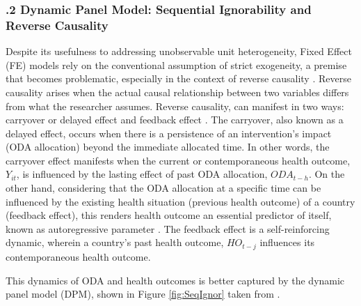 \subsubsection*{.2 Dynamic Panel Model: Sequential Ignorability and Reverse Causality}
Despite its usefulness to addressing unobservable unit heterogeneity, Fixed Effect (FE) models rely on the conventional assumption of strict exogeneity, a premise that becomes problematic, especially in the context of reverse causality \parencite{leszczensky2022deal, blackwell2018make, becker2023many}. Reverse causality arises when the actual causal relationship between two variables differs from what the researcher assumes. 
Reverse causality, can manifest in two ways: carryover or delayed effect and feedback effect \parencite{leszczensky2022deal, becker2023many}. The carryover, also known as a delayed effect, occurs when there is a persistence of an intervention's impact (ODA allocation) beyond the immediate allocated time. In other words, the carryover effect manifests when the current or contemporaneous health outcome, $Y_{it}$, is influenced by the lasting effect of past ODA allocation, $ODA_{t-h}$. On the other hand, considering that the ODA allocation at a specific time can be influenced by the existing health situation (previous health outcome) of a country (feedback effect), this renders health outcome an essential predictor of itself, known as autoregressive parameter \parencite{becker2023many, allison2017maximum}. The feedback effect is a self-reinforcing dynamic, wherein a country's past health outcome, $HO_{t-j}$ influences its contemporaneous health outcome.




 
This dynamics of ODA and health outcomes is better captured by the dynamic panel model (DPM), shown in Figure \ref{fig:SeqIgnor} taken from \textcite{allison2017maximum}. 

